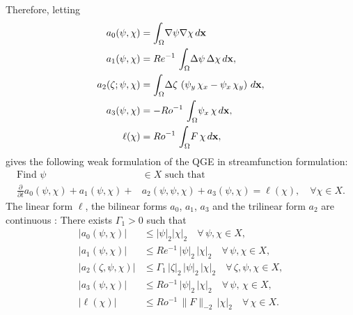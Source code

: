 Therefore, letting
\begin{align}
  a_0(\psi,\chi) &= \int_{\Omega}\! \nabla \psi \nabla \chi \,d\mathbf{x} \label{eqn:a0} \\
  a_1(\psi,\chi) &= Re^{-1} \, \int_{\Omega}\! \Delta \psi \, \Delta \chi \, d{\bf x} , \label{eqn:a1} \\
  a_2(\zeta;\psi,\chi) &= \int_{\Omega}\! \Delta \zeta \, \left( \psi_y \, \chi_x - \psi_x \, \chi_y \right) \, d{\bf x} , \label{eqn:a2} \\
  a_3(\psi,\chi) &= - Ro^{-1} \, \int_{\Omega}\! \psi_x \, \chi \, d{\bf x} , \label{eqn:a3} \\
  \ell(\chi) &= Ro^{-1} \, \int_{\Omega}\! F \, \chi \, d{\bf x} , \label{eqn:l}
\end{align}
gives the following weak formulation of the QGE in streamfunction formulation: 
\begin{equation}
  \begin{split}
    \text{Find } \psi &\in X \text{ such that} \\
    \frac{\partial}{\partial t} a_0(\psi,\chi) + a_1(\psi,\chi) +& a_2(\psi,\psi,\chi) + a_3(\psi,\chi)
    = \ell(\chi),\quad \forall \chi \in X. 
  \end{split}
  \label{eqn:QGEWF}
\end{equation}
The linear form $\ell$, the bilinear forms $a_0$, $a_1$, $a_3$ and the trilinear
form $a_2$ are continuous \cite{Cayco86}: There exists $\Gamma_1 > 0$ such that 
\begin{align}
  |a_0(\psi,\chi)| &\le |\psi|_2 |\chi|_2 \quad \forall \, \psi,\chi\in X, \label{eqn:a0cont} \\
  |a_1(\psi,\chi)| &\le Re^{-1} \,  |\psi|_2 \, |\chi|_2 \quad \forall \, \psi,\chi\in X , \label{eqn:a1Cont} \\
  |a_2(\zeta,\psi,\chi)| &\le \Gamma_1 \, |\zeta|_2 \, |\psi|_2 \, |\chi|_2 \quad \forall \, \zeta,\psi,\chi\in X , \label{eqn:a2Cont} \\
  |a_3(\psi,\chi)| &\le Ro^{-1} \, |\psi|_2 \, |\chi|_2 \quad \forall \, \psi, \, \chi \in X , \label{eqn:a3Cont} \\
  |\ell(\chi)| &\le Ro^{-1} \,\|F\|_{-2} \, |\chi|_2 \quad \forall \, \chi \in X . \label{eqn:lCont}
\end{align}
